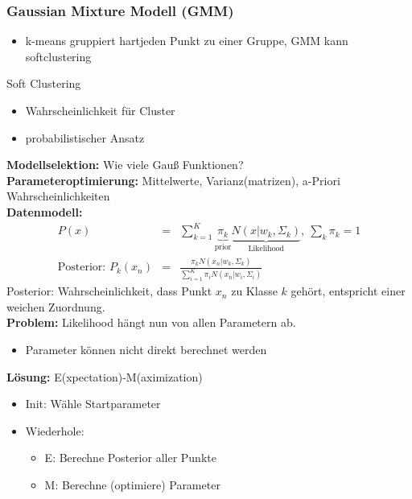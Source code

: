 	\subsubsection{Gaussian Mixture Modell (GMM)}
	\begin{itemize}
		\item k-means gruppiert \dq hart\dq jeden Punkt zu einer Gruppe, GMM kann \dq soft\dq clustering
	\end{itemize}
	Soft Clustering
	\begin{itemize}
		\item Wahrscheinlichkeit für Cluster
		\item probabilistischer Ansatz
	\end{itemize}
	\textbf{Modellselektion:} Wie viele Gauß Funktionen?\\[5pt]
	\textbf{Parameteroptimierung:} Mittelwerte, Varianz(matrizen), a-Priori Wahrscheinlichkeiten\\[5pt]
	\textbf{Datenmodell:} 
	\begin{eqnarray*}
		P(x) &=& \sum_{k=1}^K\underbrace{\pi_k}_\text{prior}\underbrace{N(x\vert w_k,\Sigma_k)}_\text{Likelihood},~ \sum_k\pi_k=1\\
		\text{Posterior: } P_k(x_n) &=& \frac{\pi_kN(x_n\vert w_k,\Sigma_k)}{\sum_{i=1}^K\pi_iN(x_n\vert w_i,\Sigma_i)}
	\end{eqnarray*}
	Posterior: Wahrscheinlichkeit, dass Punkt $x_n$ zu Klasse $k$ gehört, entspricht einer weichen Zuordnung.\\[5pt]
	\textbf{Problem:} Likelihood hängt nun von allen Parametern ab.
	\begin{itemize}
		\item Parameter können nicht direkt berechnet werden
	\end{itemize}
	\textbf{Lösung:} E(xpectation)-M(aximization)
	\begin{itemize}
		\item Init: Wähle Startparameter
		\item Wiederhole:
		\begin{itemize}
			\item E: Berechne Posterior aller Punkte
			\item M: Berechne (optimiere) Parameter
		\end{itemize}
	\end{itemize}
